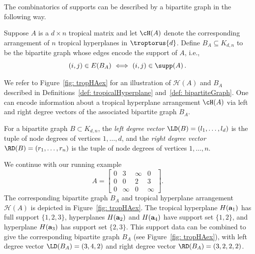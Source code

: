 The combinatorics of supports can be described by a bipartite graph in the following way.

\begin{definition}\label{def: bipartiteGraph}
Suppose $A$ is a $d \times n$ tropical matrix and let $\cH(A)$ denote the corresponding arrangement of $n$ tropical hyperplanes in $\troptorus{d}$. Define $B_A \subseteq K_{d,n}$ to be the bipartite graph whose edges encode the support of $A$, i.e.,
\[
(i,j) \in E(B_A) \ \Longleftrightarrow \ (i,j) \in \supp(A) \, .
\]
\end{definition}

We refer to Figure~\ref{fig: tropHAex} for an illustration of ${\mathcal H}(A)$ and $B_A$ described in Definitions~\ref{def: tropicalHyperplane} and~\ref{def: bipartiteGraph}.  One can encode information about a tropical hyperplane arrangement $\cH(A)$ via left and right degree vectors of the associated bipartite graph $B_A$.

\begin{definition}\label{def: leftrightDV} For a bipartite graph $B \subset K_{d,n}$, the \textit{left degree vector} $\LD(B) = (l_1, \dots, l_d)$ is the tuple of node degrees of vertices $1,\dots, d$, and the \textit{right degree vector} $\RD(B) = (r_1, \dots, r_n)$ is the tuple of node degrees of vertices $1,\dots, n$.

\end{definition}

\begin{example}\label{ex: supportSets}
We continue with our running example 
\[A = \begin{bmatrix} 0 & 3 & \infty & 0 \\ 0 & 0 & 2 & 3 \\ 0 & \infty & 0 & \infty \end{bmatrix}.\]
The corresponding bipartite graph $B_A$ and tropical hyperplane arrangement ${\mathcal H}(A)$ is depicted in Figure~\ref{fig: tropHAex}. The tropical hyperplane $H({\bf a}_1)$ has full support $\{1,2,3\}$, hyperplanes $H({\bf a}_2)$ and $H({\bf a}_4)$ have support set $\{1,2\}$, and hyperplane $H({\bf a}_3)$ has support set $\{2,3\}$. This support data can be combined to give the corresponding bipartite graph $B_A$ (see Figure~\ref{fig: tropHAex}), with left degree vector $\LD(B_A) = (3,4,2)$ and right degree vector $\RD(B_A) = (3,2,2,2)$.

\end{example}

